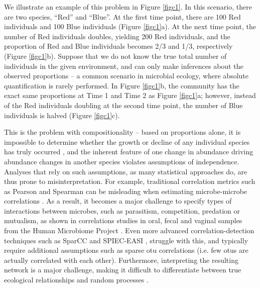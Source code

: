 We illustrate an example of this problem in Figure \ref{figc1}.  In this scenario, there are two species, “Red” and “Blue”. At the first time point, there are 100 Red individuals and 100 Blue individuals (Figure \ref{figc1}a). At the next time point, the number of Red individuals doubles, yielding 200 Red individuals, and the proportion of Red and Blue individuals becomes 2/3 and 1/3, respectively (Figure \ref{figc1}b). Suppose that we do not know the true total number of individuals in the given environment, and can only make inferences about the observed proportions -- a common scenario in microbial ecology, where absolute quantification is rarely performed.  In Figure \ref{figc1}b, the community has the exact same proportions at Time 1 and Time 2 as Figure \ref{figc1}a; however, instead of the Red individuals doubling at the second time point, the number of Blue individuals is halved (Figure \ref{figc1}c).\par
This is the problem with compositionality -- based on proportions alone, it is impossible to determine whether the growth or decline of any individual species has truly occurred \cite{Lovell_David_Muller_Warren_Taylor_Jennifer_Zwart_Alec_Helliwell2010-na}, and the inherent feature of one change in abundance driving abundance changes in another species violates assumptions of independence.  Analyses that rely on such assumptions, as many statistical approaches do, are thus prone to misinterpretation. For example, traditional correlation metrics such as Pearson and Spearman can be misleading when estimating microbe-microbe correlations \cite{sparcc}\cite{proportionality}\cite{spiec_easi}\cite{weiss_normalization}.  As a result, it becomes a major challenge to specify types of interactions between microbes, such as parasitism, competition, predation or mutualism, as shown in correlations studies in oral, fecal and vaginal samples from the Human Microbiome Project \cite{faust_microbial_interactions} \cite{sparcc}.  Even more advanced correlation-detection techniques such as SparCC \cite{sparcc} and SPIEC-EASI \cite{spiec_easi}, struggle with this, and typically require additional assumptions such as sparse \gls{otu} correlations (i.e. few \gls{otu}s are actually correlated with each other).  Furthermore, interpreting the resulting network is a major challenge, making it difficult to differentiate between true ecological relationships and random processes \cite{faust_microbial_interactions}.\par
